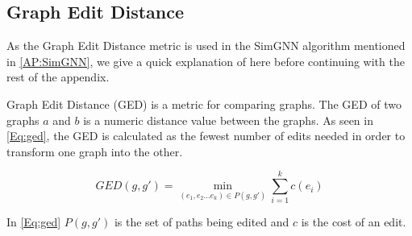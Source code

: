 \subsection{Graph Edit Distance}\label{Subsec:GED}
As the Graph Edit Distance metric is used in the SimGNN algorithm mentioned in \autoref{AP:SimGNN}, we give a quick explanation of here before continuing with the rest of the appendix.

Graph Edit Distance (GED) is a metric for comparing graphs. The GED of two graphs $a$ and $b$ is a numeric distance value between the graphs. As seen in \autoref{Eq:ged}, the GED is calculated as the fewest number of edits needed in order to transform one graph into the other.

\begin{equation}\label{Eq:ged}
 GED(g,g') = \min_{(e_1,e_2 \dots e_k) \in P(g, g') } \sum_{i=1}^k c(e_i)
\end{equation}

In \autoref{Eq:ged} $P(g,g')$ is the set of paths being edited and $c$ is the cost of an edit.
